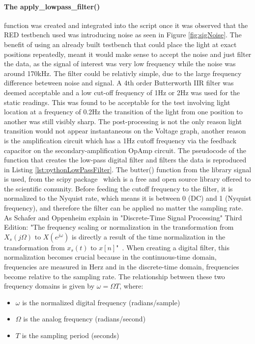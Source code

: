 \paragraph{The apply\_lowpass\_filter()} function was created and integrated into the script once it was observed that the RED testbench used was introducing noise as seen in Figure \ref{fig:sigNoise}. The benefit of using an already built testbench that could place the light at exact positions repeatedly, meant it would make sense to accept the noise and just filter the data, as the signal of interest was very low frequency while the noise was around 170kHz. The filter could be relativly simple, due to the large frequency difference beteween noise and signal. A 4th order Butterworth IIR filter was deemed acceptable and a low cut-off frequency of 1Hz or 2Hz was used for the static readings. This was found to be acceptable for the test involving light location at a frequency of 0.2Hz the transition of the light from one position to another was still visibly sharp. The post-processing is not the only reason light transition would not appear instantaneous on the Voltage graph, another reason is the amplification circuit which has a 1Hz cutoff frequency via the feedback capacitor on the secondary-amplification OpAmp circuit. 
The pseudocode of the function that creates the low-pass digital filter and filters the data is reproduced in Listing \ref{lst:pythonLowPassFilter}. The butter() function from the library signal is used, from the scipy package~\cite{RefWorks:butter} which is a free and open source library offered to the scientific comunity. Before feeding the cutoff frequency to the filter, it is normalized to the Nyquist rate, which means it is between 0 (DC) and 1 (Nyquist frequency), and therefore the filter can be applied no matter the sampling rate. As Schafer and Oppenheim explain in "Discrete-Time Signal Processing" Third Edition:
"The frequency scaling or normalization in the transformation from $ X_s(j\Omega) \text{ to } X(e^{j\omega})$ is directly a result of the time normalization in the transformation from $x_s(t) \text{ to } x[n]$"~\cite[p.171]{RefWorks:oppenheim2013discrete-time}.
When creating a digital filter, this normalization becomes crucial because in the continuous-time domain, frequencies are measured in Herz and in the discrete-time domain, frequencies become relative to the sampling rate.
The relationship between these two frequency domains is given by $\omega = \Omega T$, where:

\begin{itemize}
    \item $\omega$ is the normalized digital frequency (radians/sample)
    \item $\Omega$ is the analog frequency (radians/second)
    \item $T$ is the sampling period (seconds)
\end{itemize}

